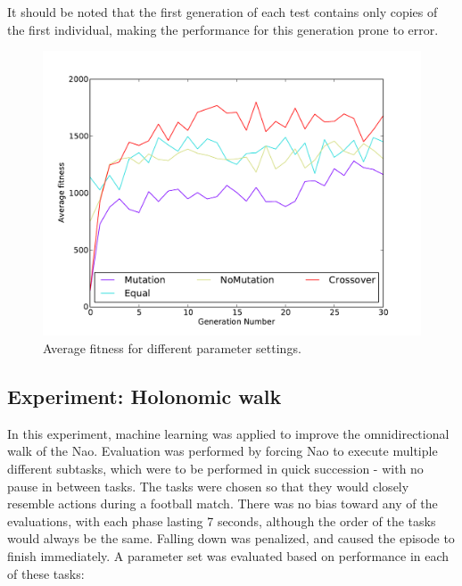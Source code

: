 \documentclass{article}
\begin{document}
It should be noted that the first generation of each test contains only copies of the first individual, making 
the performance for this generation prone to error. 

\vspace{-3mm}
\begin{figure}[h!]
  \center
  \includegraphics[width=.65\textwidth]{images/relevant_avg.pdf}
  \caption{Average fitness for different parameter settings.}
  \label{fig:avgforward}
\end{figure}

\subsection{Experiment: Holonomic walk}
In this experiment, machine learning was applied to improve the omnidirectional walk of the Nao. Evaluation was performed by forcing Nao to execute multiple different subtasks, which were to be performed in quick succession - with no pause in between tasks. The tasks were chosen so that they would closely resemble actions during a football match. There was no bias toward any of the evaluations, with each phase lasting 7 seconds, although the order of the tasks would always be the same. Falling down was penalized, and caused the episode to finish immediately. A parameter set was evaluated based on performance in each of these tasks:
 
\end{document}
